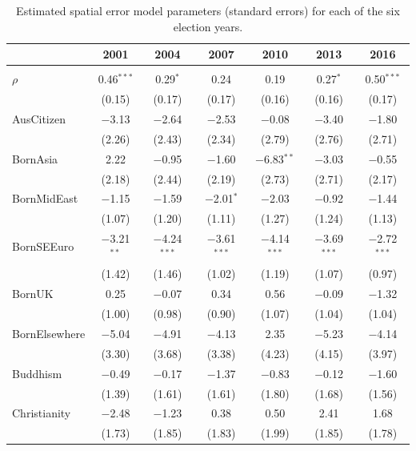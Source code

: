 \documentclass[11pt,a4paper,]{article}
\begin{document}
\begin{table}[!htbp] \centering 
  \caption{Estimated spatial error model parameters (standard errors) for each of the six election years.} 
  \label{} 
\scriptsize 
\begin{tabular}{@{\extracolsep{1pt}}lcccccc} 
\\[-1.8ex]\hline 
 & 2001 & 2004 & 2007 & 2010 & 2013 & 2016 \\ 
\hline \\[-1.8ex] 
 $\rho$ & 0.46$^{***}$ & 0.29$^{*}$ & 0.24 & 0.19 & 0.27$^{*}$ & 0.50$^{***}$ \\ 
  & (0.15) & (0.17) & (0.17) & (0.16) & (0.16) & (0.17) \\ 

 AusCitizen & $-$3.13 & $-$2.64 & $-$2.53 & $-$0.08 & $-$3.40 & $-$1.80 \\ 
  & (2.26) & (2.43) & (2.34) & (2.79) & (2.76) & (2.71) \\ 

 BornAsia & 2.22 & $-$0.95 & $-$1.60 & $-$6.83$^{**}$ & $-$3.03 & $-$0.55 \\ 
  & (2.18) & (2.44) & (2.19) & (2.73) & (2.71) & (2.17) \\ 

 BornMidEast & $-$1.15 & $-$1.59 & $-$2.01$^{*}$ & $-$2.03 & $-$0.92 & $-$1.44 \\ 
  & (1.07) & (1.20) & (1.11) & (1.27) & (1.24) & (1.13) \\ 

 BornSEEuro & $-$3.21$^{**}$ & $-$4.24$^{***}$ & $-$3.61$^{***}$ & $-$4.14$^{***}$ & $-$3.69$^{***}$ & $-$2.72$^{***}$ \\ 
  & (1.42) & (1.46) & (1.02) & (1.19) & (1.07) & (0.97) \\ 

 BornUK & 0.25 & $-$0.07 & 0.34 & 0.56 & $-$0.09 & $-$1.32 \\ 
  & (1.00) & (0.98) & (0.90) & (1.07) & (1.04) & (1.04) \\ 

 BornElsewhere & $-$5.04 & $-$4.91 & $-$4.13 & 2.35 & $-$5.23 & $-$4.14 \\ 
  & (3.30) & (3.68) & (3.38) & (4.23) & (4.15) & (3.97) \\ 

 Buddhism & $-$0.49 & $-$0.17 & $-$1.37 & $-$0.83 & $-$0.12 & $-$1.60 \\ 
  & (1.39) & (1.61) & (1.61) & (1.80) & (1.68) & (1.56) \\ 

 Christianity & $-$2.48 & $-$1.23 & 0.38 & 0.50 & 2.41 & 1.68 \\ 
  & (1.73) & (1.85) & (1.83) & (1.99) & (1.85) & (1.78) \\ 


\end{tabular}
\end{table}
\end{document}
